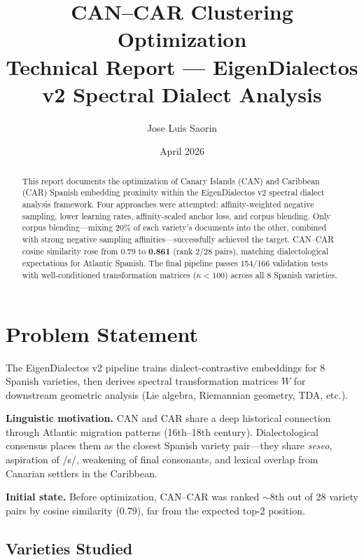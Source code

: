 \documentclass[11pt,a4paper]{article}
\title{%
  \vspace{-1cm}
  \textbf{CAN--CAR Clustering Optimization}\\[6pt]
  \large Technical Report --- EigenDialectos v2 Spectral Dialect Analysis
}
\author{Jose Luis Saorin}
\date{April 2026}
\begin{document}
\maketitle
\thispagestyle{fancy}

\begin{abstract}
This report documents the optimization of Canary Islands (CAN) and Caribbean (CAR) Spanish embedding proximity within the EigenDialectos v2 spectral dialect analysis framework. Four approaches were attempted: affinity-weighted negative sampling, lower learning rates, affinity-scaled anchor loss, and corpus blending. Only corpus blending---mixing 20\% of each variety's documents into the other, combined with strong negative sampling affinities---successfully achieved the target. CAN--CAR cosine similarity rose from 0.79 to \textbf{0.861} (rank 2/28 pairs), matching dialectological expectations for Atlantic Spanish. The final pipeline passes 154/166 validation tests with well-conditioned transformation matrices ($\kappa < 100$) across all 8 Spanish varieties.
\end{abstract}

\tableofcontents
\newpage

\section{Problem Statement}

The EigenDialectos v2 pipeline trains dialect-contrastive embeddings for 8 Spanish varieties, then derives spectral transformation matrices $W$ for downstream geometric analysis (Lie algebra, Riemannian geometry, TDA, etc.).

\textbf{Linguistic motivation.} CAN and CAR share a deep historical connection through Atlantic migration patterns (16th--18th century). Dialectological consensus places them as the closest Spanish variety pair---they share \emph{seseo}, aspiration of /s/, weakening of final consonants, and lexical overlap from Canarian settlers in the Caribbean.

\textbf{Initial state.} Before optimization, CAN--CAR was ranked ${\sim}8$th out of 28 variety pairs by cosine similarity (0.79), far from the expected top-2 position.

\subsection{Varieties Studied}
\end{document}
